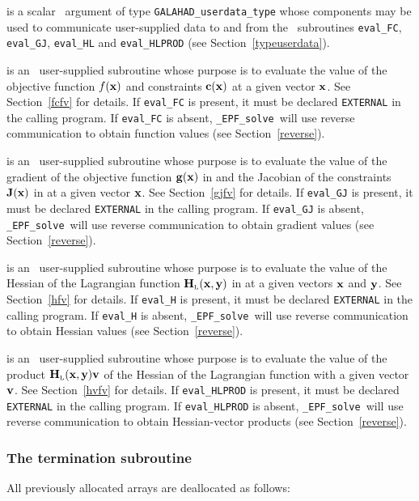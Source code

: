 \documentclass{galahad}
\newcommand{\packagename}{EPF}
\newcommand{\fullpackagename}{\libraryname\_\packagename}
\newcommand{\solver}{{\tt \fullpackagename\_solve}}
\newcommand{\bmHL}{\bmH\sub{L}}
\begin{document}
\begin{description}
 is a scalar \intentinout\ argument of type
{\tt GALAHAD\_userdata\_type} whose components may be used
to communicate user-supplied data to and from the
\optional\ subroutines
{\tt eval\_FC}, {\tt eval\_GJ},
{\tt eval\_HL} and {\tt eval\_HLPROD}
(see Section~\ref{typeuserdata}).

 is an \optional\
user-supplied subroutine whose purpose is to evaluate the value of the
objective function $f({\mathbf{x}})$ and constraints ${\mathbf{c}}({\mathbf{x}})$ at a given 
vector ${\mathbf{x}}$. See Section~\ref{fcfv} for details.
If {\tt eval\_FC} is present,
it must be declared {\tt EXTERNAL} in the calling program.
If {\tt eval\_FC} is absent, \solver\ will use reverse communication to
obtain function values (see Section~\ref{reverse}).

 is an \optional\
user-supplied subroutine whose purpose is to evaluate the value of the
gradient of the objective function ${\mathbf{g}}({\mathbf{x}})$ in 
and the Jacobian of the constraints ${\mathbf{J}}({\mathbf{x}})$ in \req{J}
at a given vector ${\mathbf{x}}$. See Section~\ref{gjfv} for details.
If {\tt eval\_GJ} is present,
it must be declared {\tt EXTERNAL} in the calling program.
If {\tt eval\_GJ} is absent, \solver\ will use reverse communication to
obtain gradient values (see Section~\ref{reverse}).

 is an \optional\
user-supplied subroutine whose purpose is to evaluate the value of the
Hessian of the Lagrangian function $\bmHL(\bmx,\bmy)$ in 
at a given vectors ${\mathbf{x}}$ and ${\mathbf{y}}$. See Section~\ref{hfv} for details.
If {\tt eval\_H} is present,
it must be declared {\tt EXTERNAL} in the calling program.
If {\tt eval\_H} is absent, \solver\ will use reverse communication to
obtain Hessian values (see Section~\ref{reverse}).

\itt{eval\_HLPROD} is an \optional\
user-supplied subroutine whose purpose is to evaluate the value of the
product $\bmHL(\bmx,\bmy) \bmv$ of the Hessian of the Lagrangian function
 with a given vector ${\mathbf{v}}$. See Section~\ref{hvfv} for details.
If {\tt eval\_HLPROD} is present,
it must be declared {\tt EXTERNAL} in the calling program.
If {\tt eval\_HLPROD} is absent, \solver\ will use reverse communication to
obtain Hessian-vector products (see Section~\ref{reverse}).

\end{description}


\subsubsection{The  termination subroutine}
All previously allocated arrays are deallocated as follows:
\vspace*{1mm}
\end{document}
